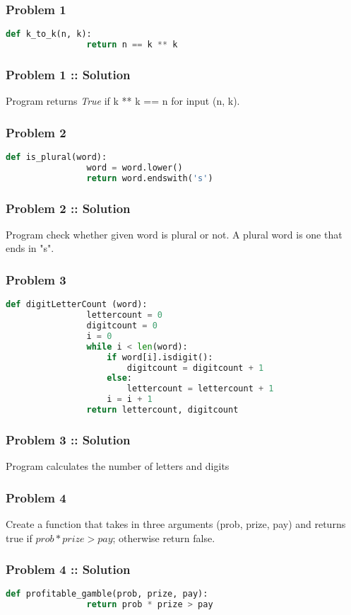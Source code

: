\documentclass[14pt]{beamer}
\begin{document}
    \begin{frame}[containsverbatim]
        \frametitle{Problem 1}
        \begin{lstlisting}[language=Python]
            def k_to_k(n, k):
                return n == k ** k
        \end{lstlisting}
    \end{frame}
    \begin{frame}
        \frametitle{Problem 1 :: Solution}
        Program returns \emph{True} if k ** k == n for input (n, k).
    \end{frame}
    \begin{frame}[containsverbatim]
        \frametitle{Problem 2}
        \begin{lstlisting}[language=Python]
            def is_plural(word):
                word = word.lower()
                return word.endswith('s')
        \end{lstlisting}
    \end{frame}
    \begin{frame}
        \frametitle{Problem 2 :: Solution}
        Program check whether given word is plural or not. A plural word is one that ends in "s".
    \end{frame}
    \begin{frame}[containsverbatim]
        \frametitle{Problem 3}
        \begin{lstlisting}[language=Python]
            def digitLetterCount (word):
                lettercount = 0
                digitcount = 0
                i = 0
                while i < len(word):
                    if word[i].isdigit():
                        digitcount = digitcount + 1
                    else:
                        lettercount = lettercount + 1
                    i = i + 1
                return lettercount, digitcount
        \end{lstlisting}
    \end{frame}
    \begin{frame}
        \frametitle{Problem 3 :: Solution}
        Program calculates the number of letters and digits
    \end{frame}
    \begin{frame}
        \frametitle{Problem 4}
        Create a function that takes in three arguments (prob, prize, pay) and returns true if $prob * prize > pay$; otherwise return false.
    \end{frame}
    \begin{frame}[containsverbatim]
        \frametitle{Problem 4 :: Solution}
        \begin{lstlisting}[language=Python]
            def profitable_gamble(prob, prize, pay):
                return prob * prize > pay
        \end{lstlisting}
    \end{frame}
\end{document}
